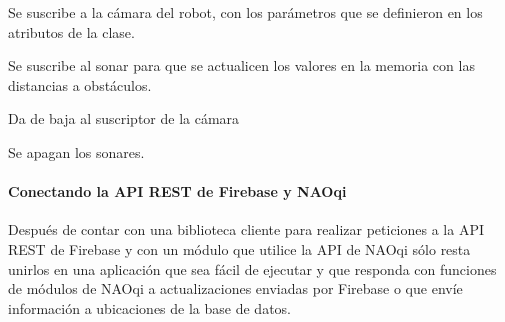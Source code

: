 \begin{fulllineitems}
\begin{fulllineitems}
\end{fulllineitems}


\begin{fulllineitems}
\label{\detokenize{nao_firebase:nao_robot.Robot.subscribe_to_camera}}
Se suscribe a la cámara del robot, con los parámetros que se definieron
en los atributos de la clase.

\end{fulllineitems}


\begin{fulllineitems}
\label{\detokenize{nao_firebase:nao_robot.Robot.subscribe_to_sonar}}
Se suscribe al sonar para que se actualicen los valores en la memoria
con las distancias a obstáculos.

\end{fulllineitems}


\begin{fulllineitems}
\label{\detokenize{nao_firebase:nao_robot.Robot.unsubscribe_to_camera}}
Da de baja al suscriptor de la cámara

\end{fulllineitems}


\begin{fulllineitems}
\label{\detokenize{nao_firebase:nao_robot.Robot.unsubscribe_to_sonar}}
Se apagan los sonares.

\end{fulllineitems}


\end{fulllineitems}



\paragraph{Conectando la API REST de Firebase y NAOqi}
\label{\detokenize{nao_firebase:conectando-la-api-rest-de-firebase-y-naoqi}}
Después de contar con una biblioteca cliente para realizar peticiones a la
API REST de Firebase y con un módulo que utilice la API de NAOqi sólo
resta unirlos en una aplicación que sea fácil de ejecutar y que responda con
funciones de módulos de NAOqi a actualizaciones enviadas por Firebase o
que envíe información a ubicaciones de la base de datos.

